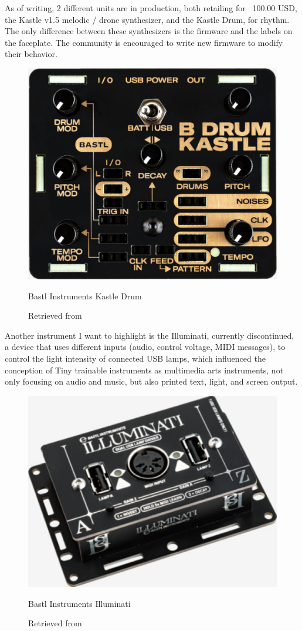 As of writing, 2 different units are in production, both retailing for ~100.00 USD, the Kastle v1.5 melodic / drone synthesizer, and the Kastle Drum, for rhythm. The only difference between these synthesizers is the firmware and the labels on the faceplate. The community is encouraged to write new firmware to modify their behavior. 

\begin{figure}[ht]
  \centering
  \includegraphics[width=0.75\linewidth,height=0.25\textheight,keepaspectratio]{images/bastl-kastle-drum.jpg}
  \caption{Bastl Instruments Kastle Drum}
  \caption*{Retrieved from \cite{website-bastl-instruments-current}}
  \label{fig:bastl-kastle-drum}
\end{figure}

Another instrument I want to highlight is the Illuminati, currently discontinued, a device that uses different inputs (audio, control voltage, MIDI messages), to control the light intensity of connected USB lamps, which influenced the conception of Tiny trainable instruments as multimedia arts instruments, not only focusing on audio and music, but also printed text, light, and screen output.

\begin{figure}[ht]
  \centering
  \includegraphics[width=0.75\linewidth,height=0.25\textheight,keepaspectratio]{images/bastl-illuminati.jpg}
  \caption{Bastl Instruments Illuminati}
  \caption*{Retrieved from \cite{website-bastl-instruments-current}}
  \label{fig:bastl-illuminati}
\end{figure}


